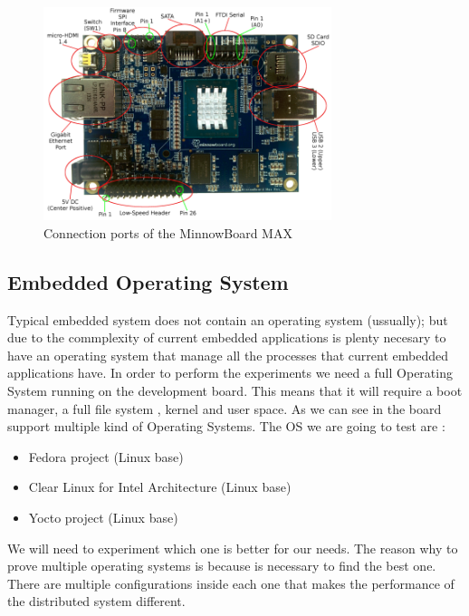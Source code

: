 \begin{figure}[H]
\centering
\includegraphics[width=0.75\textwidth]{images/minnow-max-2.png}
\caption{Connection ports of the  MinnowBoard MAX}
\label{fig:4.2}
\end{figure}

\subsection{Embedded Operating System} 

Typical embedded system does not contain an operating system (ussually); but
due to the commplexity of current embedded applications is plenty necesary to
have an operating system that manage all the processes that current embedded
applications have. In order to perform the experiments we need a full Operating
System running on the development board. This means that it will require a boot
manager, a full file system , kernel and user space.  As we can see in
\cite{minnowboard} the board support multiple kind of Operating Systems. The OS
we are going to test are : 

\begin{itemize}
    \item Fedora project (Linux base) \cite{fedora}
    \item Clear Linux for Intel Architecture (Linux base) \cite{clear-linux}
    \item Yocto project (Linux base) \cite{yocto-project}
\end{itemize}

We will need to experiment which one is better for our needs. The reason why to
prove multiple  operating systems is because is necessary to find the best one.
There are multiple configurations inside each one that makes the performance of
the distributed system different. 

